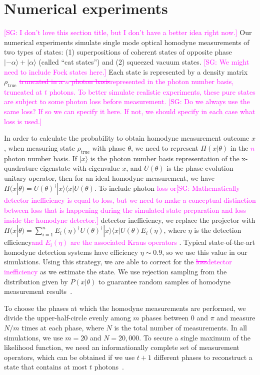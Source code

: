 \documentclass[
reprint,
superscriptaddress,
showpacs,
amsmath,
amssymb,
aps,
pra,
longbibliography
]{revtex4-1}
\providecommand{\aucmnt}[1]{#1}
\providecommand{\editcolor}[2]{\textcolor{#1}{#2}}
\providecommand{\aucmnt}[1]{}
\providecommand{\editcolor}[2]{#2}
\newcommand{\SG}[1]{\editcolor{magenta}{#1}}
\newcommand{\SGs}[1]{\aucmnt{\editcolor{magenta}{\sout{#1}}}}
\newcommand{\SGc}[1]{\aucmnt{\editcolor{magenta}{[SG: #1]}}}
\begin{document}
\section{Numerical experiments}
\label{numerical-experiments}
\SGc{I don't love this section title, but I don't have a better idea
  right now.}  Our numerical experiments simulate single mode optical
homodyne measurements of two types of states: (1) superpositions of
coherent states of opposite phase $|-\alpha\rangle + |\alpha\rangle$
(called ``cat states'') and (2) squeezed vacuum states. \SGc{We might
  need to include Fock states here.} Each state is represented by a
density matrix $\rho_{\mathrm{true}}$ \SGs{truncated in a $n$ photon
  basis}\SG{represented in the photon number basis, truncated at $t$
  photons.}  \SG{To better simulate realistic experiments, these pure
  states are subject to some photon loss before measurement.} \SGc{Do
  we always use the same loss?  If so we can specify it here.  If not,
  we should specify in each case what loss is used.}

In order to calculate the probability to obtain homodyne measurement
outcome $x$, when measuring state $\rho_{\mathrm{true}}$ with phase
$\theta$, we need to represent $\Pi (x|\theta)$ in the \SGs{$n$}
photon number basis. If $|x\rangle$ is the photon number basis
representation of the x-quadrature eigenstate with eigenvalue $x$, and
$U(\theta)$ is the phase evolution unitary operator, then for an ideal
homodyne measurement, we have
$\Pi(x|\theta) = U(\theta)^{\dagger} |x\rangle \langle x|
U(\theta)$. To include photon \SGs{loss or}\SGc{Mathematically
  detector inefficiency is equal to loss, but we need to make a
  conceptual distinction between loss that is happening during the
  simulated state preparation and loss inside the homodyne detector.}
detector inefficiency, we replace the projector with
$\Pi(x|\theta) = \sum_{i=1}^{n} E_i(\eta)^{\dagger}
U(\theta)^{\dagger} |x\rangle \langle x| U(\theta) E_i(\eta)$, where
$\eta$ is the detection efficiency\SG{and $E_i(\eta)$ are the
  associated Kraus operators \cite{Lvovsky2004}}.  Typical
state-of-the-art homodyne detection systems have efficiency
$\eta \sim 0.9$, so we use this value in our simulations. Using this
strategy, we are able to correct for the \SGs{loss}\SG{detector
  inefficiency} as we estimate the state. We use rejection sampling
from the distribution given by $P(x|\theta)$ to guarantee random
samples of homodyne measurement results~\cite{Kennedy1980}.

To choose the phases at which the homodyne measurements are performed,
we divide the upper-half-circle evenly among $m$ phases between 0 and
$\pi$ and measure $N/m$ times at each phase, where $N$ is the total
number of measurements. In all simulations, we use $m=20$ and
$N = 20,000$. To secure a single maximum of the likelihood function,
we need an informationally complete set of measurement operators,
which can be obtained if we use $t+1$ different phases to reconstruct
a state that contains at most $t$ photons~\cite{Leonhardt1997}.
\end{document}
